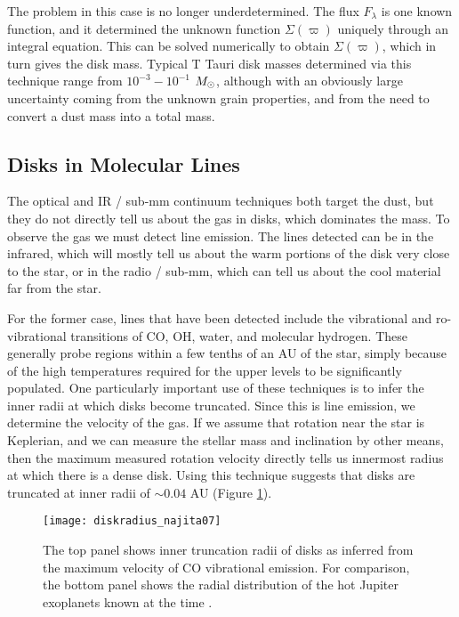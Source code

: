 The problem in this case is no longer underdetermined. The flux $F_{\lambda}$ is one known function, and it determined the unknown function $\Sigma(\varpi)$ uniquely through an integral equation. This can be solved numerically to obtain $\Sigma(\varpi)$, which in turn gives the disk mass. Typical T Tauri disk masses determined via this technique range from $10^{-3}-10^{-1}$ $M_{\odot}$, although with an obviously large uncertainty coming from the unknown grain properties, and from the need to convert a dust mass into a total mass.

\subsection{Disks in Molecular Lines}

The optical and IR / sub-mm continuum techniques both target the dust, but they do not directly tell us about the gas in disks, which dominates the mass. To observe the gas we must detect line emission. The lines detected can be in the infrared, which will mostly tell us about the warm portions of the disk very close to the star, or in the radio / sub-mm, which can tell us about the cool material far from the star.

For the former case, lines that have been detected include the vibrational and ro-vibrational transitions of CO, OH, water, and molecular hydrogen. These generally probe regions within a few tenths of an AU of the star, simply because of the high temperatures required for the upper levels to be significantly populated. One particularly important use of these techniques is to infer the inner radii at which disks become truncated. Since this is line emission, we determine the velocity of the gas. If we assume that rotation near the star is Keplerian, and we can measure the stellar mass and inclination by other means, then the maximum measured rotation velocity directly tells us innermost radius at which there is a dense disk. Using this technique suggests that disks are truncated at inner radii of $\sim 0.04$ AU (Figure \ref{fig:diskradius_najita07}).

\begin{figure}
\texttt{[image: diskradius\_najita07]}
\caption[Inner disk radii from CO line emission]{
\label{fig:diskradius_najita07}
The top panel shows inner truncation radii of disks as inferred from the maximum velocity of CO vibrational emission. For comparison, the bottom panel shows the radial distribution of the hot Jupiter exoplanets known at the time \citep{najita07b}.
}
\end{figure}

